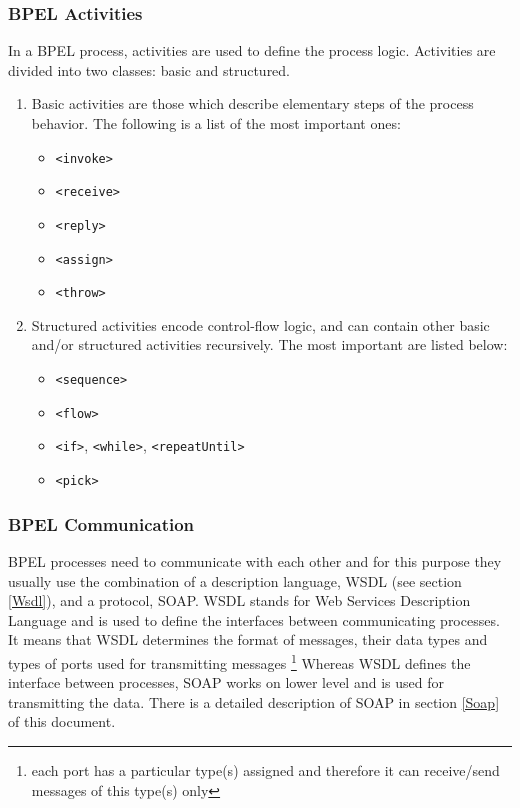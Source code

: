 \subsubsection{BPEL Activities} 
\label{BPELActivities}

In a BPEL process, activities are used to define the process logic. Activities are divided into two classes: basic and structured. 

\begin{enumerate}
\item Basic activities are those which describe elementary steps of the process behavior. The following is a list of the most important ones:
	\begin{itemize}
	\item \verb|<invoke>|
	\item \verb|<receive>|
	\item \verb|<reply>|
	\item \verb|<assign>|
	\item \verb|<throw>|
	\end{itemize}

\item Structured activities encode control-flow logic, and can contain other basic and/or structured activities recursively. The most important are listed below:
	\begin{itemize}
	\item \verb|<sequence>|
	\item \verb|<flow>|
	\item \verb|<if>|, \verb|<while>|, \verb|<repeatUntil>|  
	\item \verb|<pick>|
  \end{itemize}
\end{enumerate}


\subsubsection{BPEL Communication}
\label{BPELCommunication}
BPEL processes need to communicate with each other and for this purpose they usually use the combination of a description language, WSDL (see section \ref{Wsdl}), and a protocol, SOAP. WSDL stands for Web Services Description Language and is used to define the interfaces between communicating processes. It means that WSDL determines the format of messages, their data types and types of ports used for transmitting messages \footnote{each port has a particular type(s) assigned and therefore it can receive/send messages of this type(s) only} Whereas WSDL defines the interface between processes, SOAP works on lower level and is used for transmitting the data. There is a detailed description of SOAP in section \ref{Soap} of this document.

